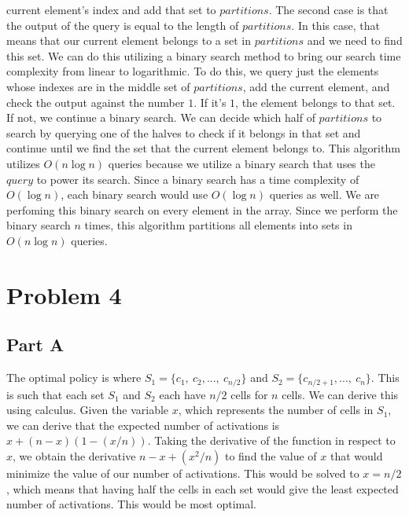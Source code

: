 \documentclass[12pt]{article}
\begin{document}
current element's index and add that set to $partitions$. The second case is that the output of the query is equal to the
length of $partitions$. In this case, that means that our current element belongs to a set in $partitions$ and
we need to find this set. We can do this utilizing a binary search method to bring our search time complexity from 
linear to logarithmic. To do this, we query just the elements whose indexes are in the middle set of $partitions$, add the current element, and check the output against the number $1$.
If it's $1$, the element belongs to that set. If not, we continue a binary search. We can decide which half of $partitions$ to
search by querying one of the halves to check if it belongs in that set and continue until we find the set that the current
element belongs to.
\newline
\newline
This algorithm utilizes $O(n\log{n})$ queries because we utilize a binary search that uses the $query$ to power its search.
Since a binary search has a time complexity of $O(\log n)$, each binary search would use $O(\log n)$ queries as well. 
We are perfoming this binary search on every element in the array. Since we perform the binary search $n$ times, this algorithm 
partitions all elements into sets in $O(n\log n)$ queries.

\newpage
\section*{Problem 4}
\subsection*{Part A}
The optimal policy is where $S_1=\{c_1,\ c_2,...,\ c_{n/2}\}$ and $S_2=\{c_{n/2 + 1},...,\ c_n\}$.
This is such that each set $S_1$ and $S_2$ each have $n/2$ cells for $n$ cells. We can derive
this using calculus.
\newline
\newline
Given the variable $x$, which represents the number of cells in $S_1$, we can derive that the expected
number of activations is $x + (n-x)(1-(x/n))$. Taking the derivative of the function in respect to $x$,
we obtain the derivative $n-x+(x^2/n)$ to find the value of $x$ that would minimize the value of our number 
of activations. This would be solved to $x=n/2$, which means that having half the cells in each set would give the least expected number
of activations. This would be most optimal.
\end{document}
